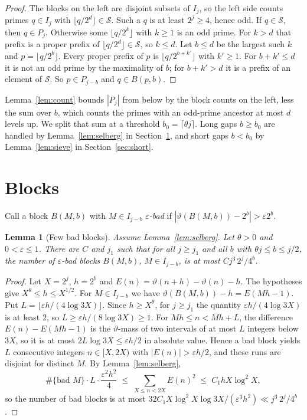 \documentclass[11pt]{amsart}
\newtheorem{lemma}{Lemma}[section]
\newcommand{\Sset}{\mathcal{S}}
\newcommand{\vt}{\vartheta}
\begin{document}
\begin{proof}
The blocks on the left are disjoint subsets of $I_j$, so the left side
counts primes $q \in I_j$ with $\lfloor q/2^d \rfloor \in \Sset$. Such a
$q$ is at least $2^j \ge 4$, hence odd. If $q \in \Sset$, then $q \in
P_j$. Otherwise some $\lfloor q/2^k\rfloor$ with $k \ge 1$ is an odd
prime. For $k > d$ that prefix is a proper prefix of
$\lfloor q/2^d\rfloor \in \Sset$, so $k \le d$. Let $b \le d$ be the
largest such $k$ and $p = \lfloor q/2^b \rfloor$. Every proper prefix of
$p$ is $\lfloor q/2^{b+k'}\rfloor$ with $k' \ge 1$. For $b + k' \le d$ it
is not an odd prime by the maximality of $b$; for $b + k' > d$ it is a
prefix of an element of $\Sset$. So $p \in P_{j-b}$ and $q \in B(p, b)$.
\end{proof}

Lemma~\ref{lem:count} bounds $|P_j|$ from below by the block counts on
the left, less the sum over $b$, which counts the primes with an
odd-prime ancestor at most $d$ levels up. We split that sum at a
threshold $b_0 = \lceil \theta j \rceil$. Long gaps $b \ge b_0$ are
handled by Lemma~\ref{lem:selberg} in Section~\ref{sec:blocks}, and short
gaps $b < b_0$ by Lemma~\ref{lem:sieve} in Section~\ref{sec:short}.

\section{Blocks}
\label{sec:blocks}

Call a block $B(M, b)$ with $M \in I_{j-b}$ \emph{$\varepsilon$-bad} if
$|\vt(B(M,b)) - 2^b| > \varepsilon 2^b$.

\begin{lemma}[Few bad blocks]
\label{lem:bad}
Assume Lemma~\ref{lem:selberg}. Let $\theta > 0$ and $0 < \varepsilon
\le 1$. There are $C$ and $j_1$ such that for all $j \ge j_1$ and all $b$
with $\theta j \le b \le j/2$, the number of $\varepsilon$-bad blocks
$B(M, b)$, $M \in I_{j-b}$, is at most $C j^3\, 2^j / 4^b$.
\end{lemma}

\begin{proof}
Let $X = 2^j$, $h = 2^b$ and $E(n) = \vt(n+h) - \vt(n) - h$. The
hypotheses give $X^\theta \le h \le X^{1/2}$. For $M \in I_{j-b}$ we have
$\vt(B(M,b)) - h = E(Mh - 1)$. Put $L = \lfloor \varepsilon h / (4 \log
3X) \rfloor$. Since $h \ge X^\theta$, for $j \ge j_1$ the quantity
$\varepsilon h/(4\log 3X)$ is at least $2$, so $L \ge \varepsilon h / (8 \log 3X) \ge 1$. For $Mh \le n < Mh + L$, the
difference $E(n) - E(Mh-1)$ is the $\vt$-mass of two intervals of at
most $L$ integers below $3X$, so it is at most $2L\log 3X \le
\varepsilon h/2$ in absolute value. Hence a bad block yields $L$
consecutive integers $n \in [X, 2X)$ with $|E(n)| > \varepsilon h/2$, and
these runs are disjoint for distinct $M$. By Lemma~\ref{lem:selberg},
\[
\#\{\text{bad } M\} \cdot L \cdot \frac{\varepsilon^2 h^2}{4} \;\le\;
\sum_{X \le n < 2X} E(n)^2 \;\le\; C_1 h X \log^2 X,
\]
so the number of bad blocks is at most
$32 C_1 X \log^2 X \log 3X / (\varepsilon^3 h^2) \ll j^3\, 2^j/4^b$.
\end{proof}
\end{document}

